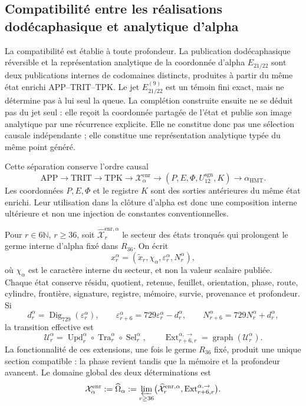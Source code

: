 \subsection{Compatibilité entre les réalisations dodécaphasique et analytique d’alpha}
\label{ix:subsec:alpha-limite-dos-vias}

La compatibilité est établie à toute profondeur. La publication
dodécaphasique réversible et la représentation analytique de la
coordonnée d'alpha
\(E_{21/22}\) sont deux publications internes de codomaines distincts,
produites à partir du même état enrichi APP--TRIT--TPK. Le jet
\(E_{21/22}^{(9)}\) est un témoin fini exact, mais ne détermine pas à lui seul
la queue. La complétion construite ensuite ne se déduit pas du jet
seul : elle reçoit la coordonnée partagée de l'état et publie son image
analytique par une récurrence explicite. Elle ne constitue donc pas une
sélection causale indépendante ; elle constitue une représentation analytique
typée du même point généré.

Cette séparation conserve l'ordre causal
\[
 \mathrm{APP}\longrightarrow\mathrm{TRIT}\longrightarrow\mathrm{TPK}
 \longrightarrow\mathcal X_{\alpha}^{\mathrm{enr}}
 \longrightarrow (P,E,\Phi,U_{12}^{\mathrm{sgn}},K)
 \longrightarrow\alpha_{\mathrm{HMT}}.
\]
Les coordonnées \(P,E,\Phi\) et le registre \(K\) sont des sorties antérieures du
même état enrichi. Leur utilisation dans la clôture d'alpha est donc une
composition interne ultérieure et non une injection de constantes
conventionnelles.

Pour \(r\in6\mathbb N\), \(r\ge36\), soit
\(\widehat{\mathcal X}^{\mathrm{enr},\alpha}_r\) le secteur des états
tronqués qui prolongent le germe interne d'alpha fixé dans \(R_{36}\). On
écrit
\[
 x_r^\alpha=(\widetilde x_r,\chi_\alpha,
              \varepsilon_r^\alpha,N_r^\alpha),
\]
où \(\chi_\alpha\) est le caractère interne du secteur, et non la valeur scalaire
publiée. Chaque état conserve résidu, quotient, retenue, feuillet, orientation,
phase, route, cylindre, frontière, signature, registre, mémoire, survie,
provenance et profondeur. Si
\[
 d_r^\alpha=\operatorname{Dig}_{729}(\varepsilon_r^\alpha),\qquad
 \varepsilon_{r+6}^\alpha=729\varepsilon_r^\alpha-d_r^\alpha,
 \qquad N_{r+6}^\alpha=729N_r^\alpha+d_r^\alpha,
\]
la transition effective est
\[
 \mathcal U_r^\alpha=
 \operatorname{Upd}_r^\alpha\circ
 \operatorname{Tra}_r^\alpha\circ
 \operatorname{Sel}_r^\alpha,
 \qquad
 \operatorname{Ext}^{\alpha,\to}_{r+6,r}
 =\operatorname{graph}(\mathcal U_r^\alpha).
\]
La fonctionnalité de ces extensions, une fois le germe \(R_{36}\) fixé,
produit une unique section compatible : la phase revient tandis que la mémoire et
la profondeur avancent. Le domaine global des deux déterminations est
\begin{equation}
 \mathcal X_\alpha^{\mathrm{enr}}:=\widehat\Omega_\alpha
 :=\varprojlim_{r\ge36}
 \bigl(\widehat{\mathcal X}^{\mathrm{enr},\alpha}_r,
       \operatorname{Ext}^{\alpha,\to}_{r+6,r}\bigr).
 \label{ix:eq:alpha-dominio-enriquecido-completo}
\end{equation}

